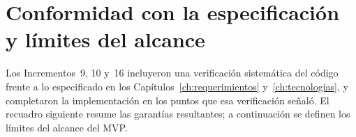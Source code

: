 
\FloatBarrier

\section{Conformidad con la especificación y límites del alcance}
\label{sec:impl_limitaciones}

Los Incrementos~9, 10 y~16 incluyeron una verificación sistemática del código frente a lo especificado en los Capítulos~\ref{ch:requerimientos} y~\ref{ch:tecnologias}, y completaron la implementación en los puntos que esa verificación señaló. El recuadro siguiente resume las garantías resultantes; a continuación se definen los límites del alcance del MVP.

